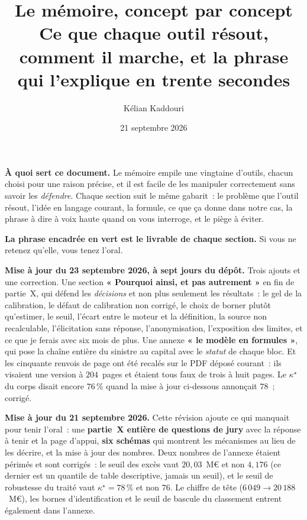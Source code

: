 \documentclass[11pt,a4paper]{article}
\title{\vspace{-1.3cm}\color{navy}\bfseries Le mémoire, concept par concept\\[3pt]
  \large Ce que chaque outil résout, comment il marche,
  et la phrase qui l'explique en trente secondes}
\author{Kélian Kaddouri}
\date{21 septembre 2026}
\begin{document}
\maketitle
\vspace{-0.8cm}

\begin{cle}
\textbf{À quoi sert ce document.} Le mémoire empile une vingtaine d'outils, chacun choisi
pour une raison précise, et il est facile de les manipuler correctement sans savoir les
\emph{défendre}. Chaque section suit le même gabarit~: le problème que l'outil résout,
l'idée en langage courant, la formule, ce que ça donne dans notre cas, la phrase à dire à
voix haute quand on vous interroge, et le piège à éviter.

\textbf{La phrase encadrée en vert est le livrable de chaque section.} Si vous ne retenez
qu'elle, vous tenez l'oral.
\end{cle}

\smallskip
\noindent\textcolor{accent}{\textbf{Mise à jour du 23 septembre 2026, à sept jours du dépôt.}}
Trois ajouts et une correction. Une section \textbf{« Pourquoi ainsi, et pas autrement »} en fin de
partie~X, qui défend les \emph{décisions} et non plus seulement les résultats~: le gel de la
calibration, le défaut de calibration non corrigé, le choix de borner plutôt qu'estimer, le seuil,
l'écart entre le moteur et la définition, la source non recalculable, l'élicitation sans réponse,
l'anonymisation, l'exposition des limites, et ce que je ferais avec six mois de plus. Une annexe
\textbf{« le modèle en formules »}, qui pose la chaîne entière du sinistre au capital avec le
\emph{statut} de chaque bloc. Et \textcolor{accent}{les cinquante renvois de page ont été recalés
sur le PDF déposé courant}~: ils visaient une version à $204$~pages et étaient tous faux de trois à
huit pages. \textcolor{accent}{Le $\kappa^\star$ du corps disait encore $76\,\%$ quand la mise à
jour ci-dessous annonçait $78$~; corrigé.}

\smallskip
\noindent\textcolor{accent}{\textbf{Mise à jour du 21 septembre 2026.}}
Cette révision ajoute ce qui manquait pour tenir l'oral~: une \textbf{partie~X entière de
questions de jury} avec la réponse à tenir et la page d'appui, \textbf{six schémas} qui montrent
les mécanismes au lieu de les décrire, et la mise à jour des nombres. \textcolor{accent}{Deux
nombres de l'annexe étaient périmés et sont corrigés}~: le seuil des excès vaut $20{,}03$~M\euro{}
et non $4{,}176$ (ce dernier est un quantile de table descriptive, jamais un seuil), et le seuil
de robustesse du traité vaut $\kappa^\star=78\,\%$ et non $76$. Le chiffre de tête
($6\,049\to20\,188$~M\euro), les bornes d'identification et le seuil de bascule du classement
entrent également dans l'annexe.
\end{document}
